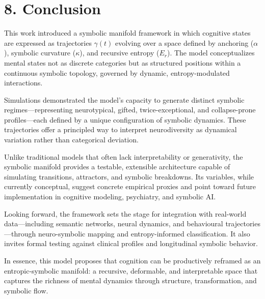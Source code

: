 \section*{8. Conclusion}

This work introduced a symbolic manifold framework in which cognitive states are expressed as trajectories $\gamma(t)$ evolving over a space defined by anchoring ($\alpha$), symbolic curvature ($\kappa$), and recursive entropy ($E_r$). The model conceptualizes mental states not as discrete categories but as structured positions within a continuous symbolic topology, governed by dynamic, entropy-modulated interactions.

Simulations demonstrated the model's capacity to generate distinct symbolic regimes—representing neurotypical, gifted, twice-exceptional, and collapse-prone profiles—each defined by a unique configuration of symbolic dynamics. These trajectories offer a principled way to interpret neurodiversity as dynamical variation rather than categorical deviation.

Unlike traditional models that often lack interpretability or generativity, the symbolic manifold provides a testable, extensible architecture capable of simulating transitions, attractors, and symbolic breakdowns. Its variables, while currently conceptual, suggest concrete empirical proxies and point toward future implementation in cognitive modeling, psychiatry, and symbolic AI.

Looking forward, the framework sets the stage for integration with real-world data—including semantic networks, neural dynamics, and behavioural trajectories—through neuro-symbolic mapping and entropy-informed classification. It also invites formal testing against clinical profiles and longitudinal symbolic behavior.

In essence, this model proposes that cognition can be productively reframed as an entropic-symbolic manifold: a recursive, deformable, and interpretable space that captures the richness of mental dynamics through structure, transformation, and symbolic flow.